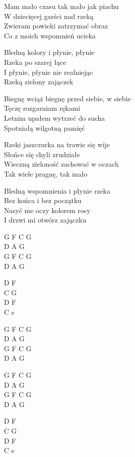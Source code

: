
\begin{text}
    Mam mało czasu tak mało jak piachu\\
    W dziecięcej garści nad rzeką\\
    Zwieram powieki zatrzymać obraz\\
    Co z moich wspomnień ucieka

    \vin Bledną kolory i płynie, płynie\\
    \vin Rzeka po szarej łące\\
    \vin I płynie, płynie nie realniejąc\\
    \vin Rzeką zielony zajączek

    Biegnę wciąż biegnę przed siebie, w siebie\\
    Tęczę rozgarniam rękami\\
    Letnim upałem wytrzeć do sucha\\
    Spotniałą wilgotną pamięć

    Rzeki jaszczurka na trawie się wije\\
    Słońce się chyli zrudziałe\\
    Wieczną zieloność zachować w oczach\\
    Tak wiele pragnę, tak mało

    \vin Bledną wspomnienia i płynie rzeka\\
    \vin Bez końca i bez początku\\
    \vin Nasyć me oczy kolorem rosy\\
    \vin I drzwi mi otwórz zajączku
\end{text}
\begin{chord}
    G F C G\\
    D A G\\
    G F C G\\
    D A G

    D F\\
    C G\\
    D F\\
    C e

    G F C G\\
    D A G\\
    G F C G\\
    D A G

    G F C G\\
    D A G\\
    G F C G\\
    D A G

    D F\\
    C G\\
    D F\\
    C e
\end{chord}
